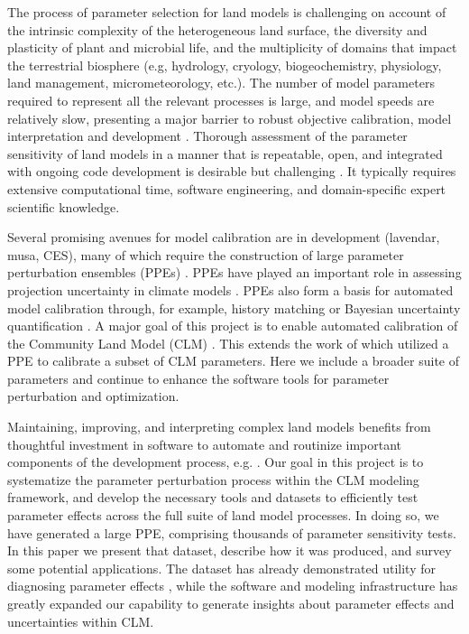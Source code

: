 \documentclass[draft]{agujournal2019}
\begin{document}
The process of parameter selection for land  models is challenging on account of the intrinsic complexity of the heterogeneous land surface, the diversity and plasticity of plant and microbial life, and the multiplicity of domains that impact the terrestrial biosphere (e.g, hydrology, cryology, biogeochemistry, physiology, land management, micrometeorology, etc.). The number of model parameters required to represent all the relevant processes is large, and model speeds are relatively slow, presenting a major barrier to robust objective calibration, model interpretation and development \cite{fisher2020,dagon2020}.
Thorough assessment of the parameter sensitivity of land models in a manner that is repeatable, open, and integrated with ongoing code development is desirable but challenging \cite{hourdin2017,balaji2022}. It typically requires extensive computational time,  software engineering, and domain-specific expert scientific knowledge.  

Several promising avenues for model calibration are in development (lavendar, musa, CES), many of which require the construction of large parameter perturbation ensembles (PPEs) \cite{qian2018}. 
PPEs have played an important role in assessing projection uncertainty in climate models \cite{murphy2004,sanderson2008,booth2012,hawkins2019,yamazaki2021,peatier2022,tett2022}.
PPEs also form a basis for automated model calibration through, for example, history matching \cite{williamson2013,williamson2017,hourdin2020,couvreux2021} or Bayesian uncertainty quantification \cite{cleary2021}.
A major goal of this project is to enable automated calibration of the Community Land Model (CLM) \cite{lawrence2019}. This extends the work of  which utilized a PPE to calibrate a subset of CLM parameters. Here we include a broader suite of parameters and continue to enhance the software tools for parameter perturbation and optimization.

Maintaining, improving, and interpreting complex land models benefits from thoughtful investment in software to automate and routinize important components of the development process, e.g. . 
Our goal in this project is to systematize the parameter perturbation process within the CLM modeling framework, and develop the necessary tools and datasets to efficiently test parameter effects across the full suite of land model processes. 
In doing so, we have generated a large PPE, comprising thousands of parameter sensitivity tests.
In this paper we present that dataset, describe how it was produced, and survey some potential applications.
The dataset has already demonstrated utility for diagnosing parameter effects \cite{cheng2023,yan2023a,yan2023b}, while the software and modeling infrastructure has greatly expanded our capability to generate insights about parameter effects and uncertainties within CLM.
\end{document}
